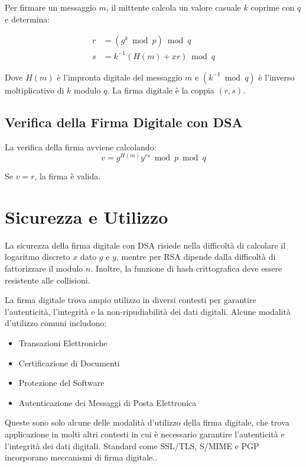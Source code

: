 \documentclass[a4paper,12pt]{report}
\begin{document}
Per firmare un messaggio $m$, il mittente calcola un valore casuale $k$ coprime con $q$ e determina:

\begin{align*}
r &= (g^k \bmod p) \bmod q \\
s &= k^{-1}(H(m) + xr) \bmod q
\end{align*}

Dove $H(m)$ è l'impronta digitale del messaggio $m$ e $(k^{-1} \bmod q)$ è l'inverso moltiplicativo di $k$ modulo $q$. La firma digitale è la coppia $(r, s)$.

\subsection{Verifica della Firma Digitale con DSA}
La verifica della firma avviene calcolando:
\[v = g^{H(m)}y^{rs} \bmod p \bmod q\]

Se $v = r$, la firma è valida.

\section{Sicurezza e Utilizzo}
La sicurezza della firma digitale con DSA risiede nella difficoltà di calcolare il logaritmo discreto $x$ dato $g$ e $y$, mentre per RSA dipende dalla difficoltà di fattorizzare il modulo $n$. Inoltre, la funzione di hash crittografica deve essere resistente alle collisioni.

La firma digitale trova ampio utilizzo in diversi contesti per garantire l'autenticità, l'integrità e la non-ripudiabilità dei dati digitali. Alcune modalità d'utilizzo comuni includono:

\begin{itemize}
    \item Transazioni Elettroniche
    \item Certificazione di Documenti
    \item Protezione del Software
    \item Autenticazione dei Messaggi di Posta Elettronica
\end{itemize}

Queste sono solo alcune delle modalità d'utilizzo della firma digitale, che trova applicazione in molti altri contesti in cui è necessario garantire l'autenticità e l'integrità dei dati digitali. Standard come SSL/TLS, S/MIME e PGP incorporano meccanismi di firma digitale..
%
%
%
%
%
%
%
%
%
%
%
%

\nocite{*}


\end{document}
